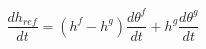 \begin{equation}
\frac{dh_{ref}}{dt} = (h^f-h^g) \frac{d\theta^f }{dt} + h^g \frac{d\theta^g }{dt}
\end{equation}